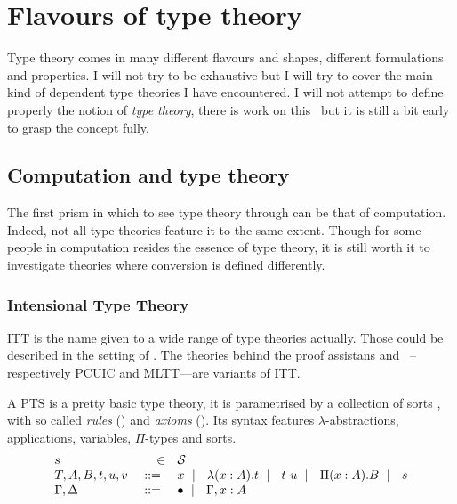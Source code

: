 \chapter{Flavours of type theory}

Type theory comes in many different flavours and shapes, different formulations
and properties. I will not try to be exhaustive but I will try to cover the
main kind of dependent type theories I have encountered.
I will not attempt to define properly the notion of \emph{type theory},
there is work on this~\misref{} but it is still a bit early to grasp the
concept fully.

\section{Computation and type theory}

The first prism in which to see type theory through can be that of computation.
Indeed, not all type theories feature it to the same extent. Though for some
people in computation resides the essence of type theory, it is still worth
it to investigate theories where conversion is defined differently.

\subsection{Intensional Type Theory}

\acrfull{ITT} is the name given to a wide range of type theories actually.
Those could be described in the setting of .
The theories behind the proof assistans \Coq and
\Agda~--respectively \acrfull{PCUIC} and
\acrfull{MLTT}---are variants of \acrshort{ITT}.

A \acrshort{PTS} is a pretty basic type theory, it is parametrised by a
collection of sorts \cS, with so called \emph{rules}
(\Rl) and \emph{axioms} (\Ax).
Its syntax features \(\lambda\)-abstractions, applications, variables,
\(\Pi\)-types and sorts.
%
\[
  \begin{array}{lrl}
    s &\in& \mathcal{S} \\
    T,A,B,t,u,v &\ \mathrel{{:}{:}{=}}\ & x \ \mid\ \  \lambda (x:A). t \ \mid\ \  t\ u
    \ \mid\ \  \Pi (x : A). B \ \mid\ \  s \\
    \Gamma, \Delta &\ \mathrel{{:}{:}{=}}\ & \bullet \ \mid\ \  \Gamma, x:A
  \end{array}
\]

